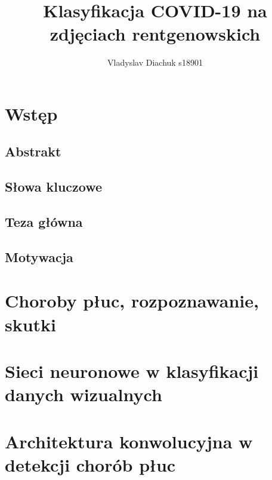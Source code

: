 \documentclass{article}
\title{Klasyfikacja COVID-19 na zdjęciach rentgenowskich}
\author{Vladyslav Diachuk s18901}
\begin{document}
\maketitle

\section{Wstęp}

\subsection{Abstrakt}


\subsection{Słowa kluczowe}


\subsection{Teza główna}

\subsection{Motywacja}


\section{Choroby płuc, rozpoznawanie, skutki}


\section{Sieci neuronowe w klasyfikacji danych wizualnych}


\section{Architektura konwolucyjna w detekcji chorób płuc}




	
\end{document}
